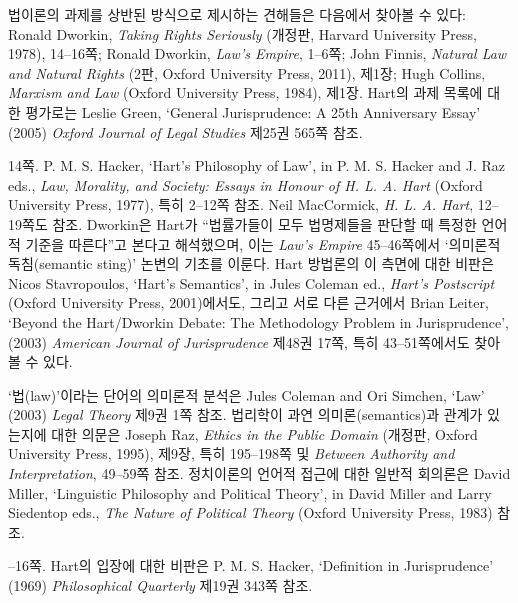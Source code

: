 {법이론의 과제를 상반된 방식으로 제시하는 견해들은 다음에서 찾아볼 수
있다: Ronald Dworkin, \emph{Taking Rights Seriously} (개정판, Harvard
University Press, 1978), 14--16쪽; Ronald Dworkin, \emph{Law's Empire},
1--6쪽; John Finnis, \emph{Natural Law and Natural Rights} (2판, Oxford
University Press, 2011), 제1장; Hugh Collins, \emph{Marxism and Law}
(Oxford University Press, 1984), 제1장. Hart의 과제 목록에 대한 평가로는
Leslie Green, `General Jurisprudence: A 25th Anniversary Essay' (2005)
\emph{Oxford Journal of Legal Studies} 제25권 565쪽 참조.

\noteentry 14쪽.  P. M. S. Hacker, `Hart's Philosophy
of Law', in P. M. S. Hacker and J. Raz eds., \emph{Law, Morality, and
Society: Essays in Honour of H. L. A. Hart} (Oxford University Press,
1977), 특히 2--12쪽 참조. Neil MacCormick, \emph{H. L. A. Hart},
12--19쪽도 참조. Dworkin은 Hart가 “법률가들이 모두 법명제들을 판단할 때
특정한 언어적 기준을 따른다”고 본다고 해석했으며, 이는 \emph{Law's
Empire} 45--46쪽에서 ‘의미론적 독침(semantic sting)’ 논변의 기초를
이룬다. Hart 방법론의 이 측면에 대한 비판은 Nicos Stavropoulos, `Hart's
Semantics', in Jules Coleman ed., \emph{Hart's Postscript} (Oxford
University Press, 2001)에서도, 그리고 서로 다른 근거에서 Brian Leiter,
`Beyond the Hart/Dworkin Debate: The Methodology Problem in
Jurisprudence', (2003) \emph{American Journal of Jurisprudence} 제48권
17쪽, 특히 43--51쪽에서도 찾아볼 수 있다.

‘법(law)’이라는 단어의 의미론적 분석은 Jules Coleman and Ori Simchen,
`Law' (2003) \emph{Legal Theory} 제9권 1쪽 참조. 법리학이 과연
의미론(semantics)과 관계가 있는지에 대한 의문은 Joseph Raz, \emph{Ethics
in the Public Domain} (개정판, Oxford University Press, 1995), 제9장,
특히 195--198쪽 및 \emph{Between Authority and Interpretation}, 49--59쪽
참조. 정치이론의 언어적 접근에 대한 일반적 회의론은 David Miller,
`Linguistic Philosophy and Political Theory', in David Miller and Larry
Siedentop eds., \emph{The Nature of Political Theory} (Oxford University
Press, 1983) 참조.

--16쪽.  Hart의 입장에 대한 비판은 P. M. S. Hacker, `Definition
in Jurisprudence' (1969) \emph{Philosophical Quarterly} 제19권 343쪽
참조.

}
